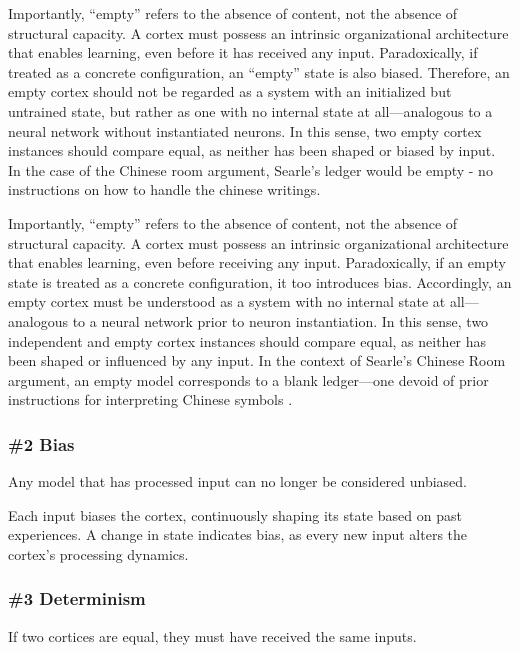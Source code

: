 \documentclass{article}
\newenvironment{one_assertion}[1]
{
  \begin{tabular}{p{1.5cm}p{8.2cm}}
    \textbf{Assertion:} & #1 \\
}{
  \end{tabular}\\
}
\begin{document}
Importantly, “empty” refers to the absence of content, not the absence of structural capacity. A cortex must possess an intrinsic organizational architecture that enables learning, even before it has received any input. Paradoxically, if treated as a concrete configuration, an “empty” state is also biased. Therefore, an empty cortex should not be regarded as a system with an initialized but untrained state, but rather as one with no internal state at all—analogous to a neural network without instantiated neurons. In this sense, two empty cortex instances should compare equal, as neither has been shaped or biased by input. In the case of the Chinese room argument, Searle's ledger would be empty - no instructions on how to handle the chinese writings.

Importantly, “empty” refers to the absence of content, not the absence of structural capacity. A cortex must possess an intrinsic organizational architecture that enables learning, even before receiving any input. Paradoxically, if an empty state is treated as a concrete configuration, it too introduces bias. Accordingly, an empty cortex must be understood as a system with no internal state at all—analogous to a neural network prior to neuron instantiation. In this sense, two independent and empty cortex instances should compare equal, as neither has been shaped or influenced by any input. In the context of Searle’s Chinese Room argument, an empty model corresponds to a blank ledger—one devoid of prior instructions for interpreting Chinese symbols \cite{Sprogar2018}.


\subsubsection*{\#2 Bias}
\begin{one_assertion}
    {Any model that has processed input can no longer be considered unbiased.}
\end{one_assertion}

Each input biases the cortex, continuously shaping its state based on past experiences. A change in state indicates bias, as every new input alters the cortex's processing dynamics.

\subsubsection*{\#3 Determinism}
\begin{one_assertion}
    {If two cortices are equal, they must have received the same inputs.}
\end{one_assertion}
\end{document}
